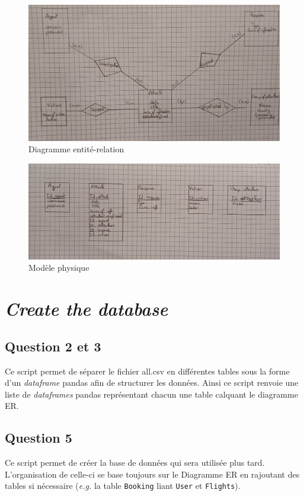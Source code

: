 \documentclass{ceri/sty/rapport}
\begin{document}
\begin{figure}[h]
    \centering
    \includegraphics[width=0.85\linewidth]{images/diag_er.png}
    \caption{Diagramme entité-relation}
    \label{fig:diag_er}
\end{figure}

\begin{figure}[h]
    \centering
    \includegraphics[width=0.85\linewidth]{images/diag_phys.png}
    \caption{Modèle physique}
    \label{fig:diag_phys}
\end{figure}

\section{\textit{Create the database}}
\subsection{Question 2 et 3}
Ce script permet de séparer le fichier all.csv en différentes tables sous la forme d'un \textit{dataframe} pandas afin de structurer les données.
Ainsi ce script renvoie une liste de \textit{dataframes} pandas représentant chacun une table calquant le diagramme ER. 

\subsection{Question 5}
Ce script permet de créer la base de données qui sera utilisée plus tard. 
L'organisation de celle-ci se base toujours sur le Diagramme ER en rajoutant des tables si nécessaire (\textit{e.g.} la table \texttt{Booking} liant \texttt{User} et \texttt{Flights}).
\end{document}
